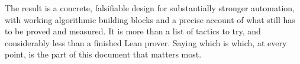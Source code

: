 The result is a concrete, falsifiable design for substantially stronger
automation, with working algorithmic building blocks and a precise account of
what still has to be proved and measured. It is more than a list of tactics to
try, and considerably less than a finished Lean prover. Saying which is which,
at every point, is the part of this document that matters most.
